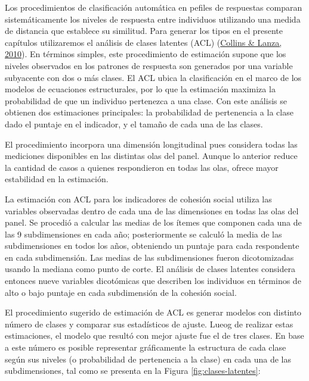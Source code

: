 \documentclass[
  12pt,
]{book}
\begin{document}
Los procedimientos de clasificación automática en pefiles de respuestas comparan sistemáticamente los niveles de respuesta entre individuos utilizando una medida de distancia que establece su similitud. Para generar los tipos en el presente capítulos utilizaremos el análisis de clases latentes (ACL) (\protect\hyperlink{ref-collins_latent_2010}{Collins \& Lanza, 2010}). En términos simples, este procedimiento de estimación supone que los niveles observados en los patrones de respuesta son generados por una variable subyacente con dos o más clases. El ACL ubica la clasificación en el marco de los modelos de ecuaciones estructurales, por lo que la estimación maximiza la probabilidad de que un individuo pertenezca a una clase. Con este análisis se obtienen dos estimaciones principales: la probabilidad de pertenencia a la clase dado el puntaje en el indicador, y el tamaño de cada una de las clases.

El procedimiento incorpora una dimensión longitudinal pues considera todas las mediciones disponibles en las distintas olas del panel. Aunque lo anterior reduce la cantidad de casos a quienes respondieron en todas las olas, ofrece mayor estabilidad en la estimación.

La estimación con ACL para los indicadores de cohesión social utiliza las variables observadas dentro de cada una de las dimensiones en todas las olas del panel. Se procedió a calcular las medias de los ítemes que componen cada una de las 9 subdimensiones en cada año; posteriormente se calculó la media de las subdimensiones en todos los años, obteniendo un puntaje para cada respondente en cada subdimensión. Las medias de las subdimensiones fueron dicotomizadas usando la mediana como punto de corte. El análisis de clases latentes considera entonces nueve variables dicotómicas que describen los individuos en términos de alto o bajo puntaje en cada subdimensión de la cohesión social.

El procedimiento sugerido de estimación de ACL es generar modelos con distinto número de clases y comparar sus estadísticos de ajuste. Lueog de realizar estas estimaciones, el modelo que resultó con mejor ajuste fue el de tres clases. En base a este número es posible representar gráficamente la estructura de cada clase según sus niveles (o probabilidad de pertenencia a la clase) en cada una de las subdimensiones, tal como se presenta en la Figura \ref{fig:clases-latentes}:
\end{document}
